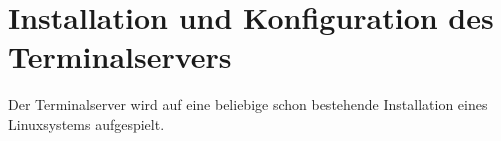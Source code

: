 \chapter{Installation und Konfiguration des Terminalservers}
Der Terminalserver wird auf eine beliebige schon bestehende Installation eines Linuxsystems aufgespielt.
  
